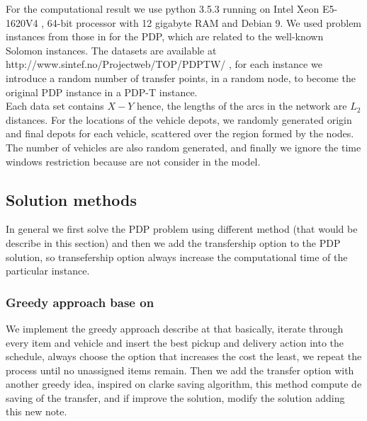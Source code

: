 \documentclass[10pt,twoside]{article}
\begin{document}
For the computational result we use python 3.5.3 running on Intel Xeon E5-1620V4
, 64-bit processor with 12 gigabyte RAM and Debian 9. We used problem instances
from those in for the PDP, which are related to the well-known Solomon instances.
The datasets are available at http://www.sintef.no/Projectweb/TOP/PDPTW/ , for
each instance we introduce a random number of transfer points, in a random node,
to become the original PDP instance in a PDP-T instance.\\

Each data set contains $X - Y$ hence, the lengths of the arcs in the network are
$L_2$ distances. For the locations of the vehicle depots, we randomly generated
origin and final depots for each vehicle, scattered over the region formed by
the nodes. The number of vehicles are also random generated, and finally we
ignore the time windows restriction because are not consider in the model.

\subsection{Solution methods}\label{sec_sol}
In general we first solve the PDP problem using different method (that would be
describe in this section) and then we add the transfership option to the PDP
solution, so transefership option always increase the computational time of the
particular instance.

\subsubsection{Greedy approach base on \cite{multiagent}}
We implement the greedy approach describe at \cite{multiagent} that basically,
iterate through every item and vehicle and insert the best pickup and delivery
action into the schedule, always choose the option that increases the cost the
least, we repeat the process until no unassigned items remain. Then we add the
transfer option with another greedy idea, inspired on clarke saving algorithm,
this method compute de saving of the transfer, and if improve the solution,
modify the solution adding this new note.
\end{document}
